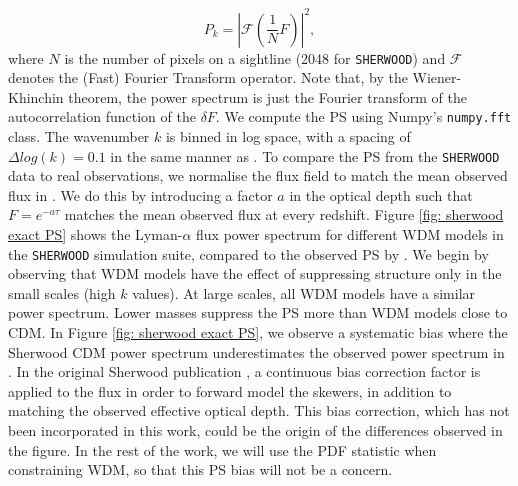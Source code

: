 \begin{equation}\label{eq: PS def}
        P_k = \left| \mathcal{F}(\frac{1}{N} F)  \right| ^2,
\end{equation}
where $N$ is the number of pixels on a sightline (2048 for \texttt{SHERWOOD}) and $\mathcal{F}$ denotes the (Fast) Fourier Transform operator. Note that, by the Wiener-Khinchin theorem, the power spectrum is just the Fourier transform of the autocorrelation function of the $\delta F$. We compute the PS using Numpy's \texttt{numpy.fft} class. The wavenumber $k$ is binned in log space, with a spacing of $\Delta log(k)=0.1$ in the same manner as \cite{Boera_2019}. To compare the PS from the \texttt{SHERWOOD} data to real observations, we normalise the flux field to match the mean observed flux in \cite{Becker_mean_flux}. We do this by introducing a factor $a$ in the optical depth such that $F=e^{-a\tau}$ matches the mean observed flux at every redshift. Figure \ref{fig: sherwood exact PS} shows the Lyman-$\alpha$ flux power spectrum for different WDM models in the \texttt{SHERWOOD} simulation suite, compared to the observed PS by \cite{Boera_2019}. We begin by observing that WDM models have the effect of suppressing structure only in the small scales (high $k$ values). At large scales, all WDM models have a similar power spectrum. Lower masses suppress the PS more than WDM models close to CDM.
In Figure \ref{fig: sherwood exact PS}, we observe a systematic bias where the Sherwood CDM power spectrum underestimates the observed power spectrum in \cite{Boera_2019}. In the original Sherwood publication \cite{Bolton_2016}, a continuous bias correction factor is applied to the flux in order to forward model the skewers, in addition to matching the observed effective optical depth. This bias correction, which has not been incorporated in this work, could be the origin of the differences observed in the figure. In the rest of the work, we will use the PDF statistic when constraining WDM, so that this PS bias will not be a concern.

